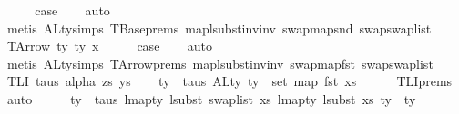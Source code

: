 \begin{isabellebody}
\ \ \isamarkupfalse%
\ \isamarkupfalse%
\ {\isacharquery}{\kern0pt}case\isanewline
\ \ \isamarkupfalse%
\ auto\isanewline
\ \ \isamarkupfalse%
\ {\isacharparenleft}{\kern0pt}metis\ ALty{\isachardot}{\kern0pt}simps{\isacharparenleft}{\kern0pt}{}{\isacharparenright}{\kern0pt}\ TBase{\isachardot}{\kern0pt}prems{\isacharparenleft}{\kern0pt}{}{\isacharparenright}{\kern0pt}\ map{\isacharunderscore}{\kern0pt}lsubst{\isacharunderscore}{\kern0pt}inv{\isacharunderscore}{\kern0pt}inv\ swap{\isacharunderscore}{\kern0pt}map{\isacharunderscore}{\kern0pt}snd\ swap{\isacharunderscore}{\kern0pt}swap{\isacharunderscore}{\kern0pt}list{\isacharparenright}{\kern0pt}\isanewline
{}\isamarkupfalse%
\isanewline
\ \ \isamarkupfalse%
\ {\isacharparenleft}{\kern0pt}TArrow\ ty{}\ ty{}\ x{}{\isacharparenright}{\kern0pt}\isanewline
\ \ \isamarkupfalse%
\ \isamarkupfalse%
\ {\isacharquery}{\kern0pt}case\isanewline
\ \ \isamarkupfalse%
\ auto\isanewline
\ \ \isamarkupfalse%
\ {\isacharparenleft}{\kern0pt}metis\ ALty{\isachardot}{\kern0pt}simps{\isacharparenleft}{\kern0pt}{}{\isacharparenright}{\kern0pt}\ TArrow{\isachardot}{\kern0pt}prems{\isacharparenleft}{\kern0pt}{}{\isacharparenright}{\kern0pt}\ map{\isacharunderscore}{\kern0pt}lsubst{\isacharunderscore}{\kern0pt}inv{\isacharunderscore}{\kern0pt}inv\ swap{\isacharunderscore}{\kern0pt}map{\isacharunderscore}{\kern0pt}fst\ swap{\isacharunderscore}{\kern0pt}swap{\isacharunderscore}{\kern0pt}list{\isacharparenright}{\kern0pt}\isanewline
{}\isamarkupfalse%
\isanewline
\ \ \isamarkupfalse%
\ {\isacharparenleft}{\kern0pt}TLI\ taus\ alpha\ zs\ ys{\isacharparenright}{\kern0pt}\isanewline
\isanewline
\ \ \isamarkupfalse%
\ {\isachardoublequoteopen}{\isasymforall}ty\ {\isasymin}{\isacharhash}{\kern0pt}\ taus{\isachardot}{\kern0pt}\ ALty\ ty\ {\isasymsubseteq}\ set\ {\isacharparenleft}{\kern0pt}map\ fst\ xs{\isacharparenright}{\kern0pt}{\isachardoublequoteclose}\isanewline
\ \ \ \ \isamarkupfalse%
\ TLI{\isachardot}{\kern0pt}prems{\isacharparenleft}{\kern0pt}{}{\isacharparenright}{\kern0pt}\ \isamarkupfalse%
\ auto\isanewline
\isanewline
\ \ \isamarkupfalse%
\ \isamarkupfalse%
\ {\isachardoublequoteopen}{\isasymforall}ty\ {\isasymin}{\isacharhash}{\kern0pt}\ taus{\isachardot}{\kern0pt}\ {\isacharparenleft}{\kern0pt}lmap{\isacharunderscore}{\kern0pt}ty\ {\isacharparenleft}{\kern0pt}lsubst\ {\isacharparenleft}{\kern0pt}swap{\isacharunderscore}{\kern0pt}list\ xs{\isacharparenright}{\kern0pt}{\isacharparenright}{\kern0pt}{\isacharparenright}{\kern0pt}\ {\isacharparenleft}{\kern0pt}lmap{\isacharunderscore}{\kern0pt}ty\ {\isacharparenleft}{\kern0pt}lsubst\ xs{\isacharparenright}{\kern0pt}\ ty{\isacharparenright}{\kern0pt}\ {\isacharequal}{\kern0pt}\ ty{\isachardoublequoteclose}\isanewline

\end{isabellebody}
